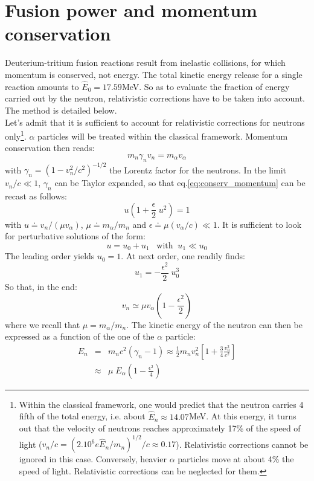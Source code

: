 \section{Fusion power and momentum conservation}
\label{appendix:fusion_power}

Deuterium-tritium fusion reactions result from inelastic collisions, for which momentum is conserved, not energy. The total kinetic energy release for a single reaction amounts to $\hat E_0 = 17.59$MeV. So as to evaluate the fraction of energy carried out by the neutron, relativistic corrections have to be taken into account. The method is detailed below. \\

Let's admit that it is sufficient to account for relativistic corrections for neutrons only\footnote{Within the classical framework, one would predict that the neutron carries 4 fifth of the total energy, i.e. about $\hat E_n \approx 14.07$MeV. At this energy, it turns out that the velocity of neutrons reaches approximately 17\% of the speed of light ($v_n/c = (2.10^6e\hat E_n/m_n)^{1/2}/c \approx 0.17$). Relativistic corrections cannot be ignored in this case. Conversely, heavier $\alpha$ particles move at about 4\% the speed of light. Relativistic corrections can be neglected for them.}. $\alpha$ particles will be treated within the classical framework.
Momentum conservation then reads:
\begin{equation}
    m_n \gamma_n v_n = m_\alpha v_\alpha
    \label{eq:conserv_momentum}
\end{equation}
with $\gamma_n = (1-v_n^2/c^2)^{-1/2}$ the Lorentz factor for the neutrons. In the limit $v_n/c \ll1$,  $\gamma_n$ can be Taylor expanded, so that eq.\ref{eq:conserv_momentum} can be recast as follows:
\begin{equation}
    u \left( 1+\frac{\epsilon}{2}\; u^2 \right) 
    = 1
    \label{eq:conserv_momentum2}
\end{equation}
with $u \doteq v_n/(\mu v_\alpha)$, $\mu \doteq m_\alpha/m_n$ and $\epsilon \doteq \mu (v_\alpha/c)\ll1$. It is sufficient to look for perturbative solutions of the form: 
$$ u = u_0 + u_1 \;\;\; \textrm{with} \;\; u_1\ll u_0 $$
The leading order yields $u_0=1$. At next order, one readily finds:
$$ u_1 = -\frac{\epsilon^2}{2} \; u_0^3 $$
So that, in the end:
\begin{equation*}
    v_n \simeq \mu v_\alpha \left( 1-\frac{\epsilon^2}{2}\right)
\end{equation*}
where we recall that $\mu=m_\alpha/m_n$.
The kinetic energy of the neutron can then be expressed as a function of the one of the $\alpha$ particle:
\begin{eqnarray*}
    E_n &=& m_nc^2(\gamma_n-1) \approx 
    \frac{1}{2} m_nv_n^2\left[ 1+ \frac{3}{4}\frac{v_n^2}{c^2}\right] \nonumber \\
    &\approx& \mu\; E_\alpha \left( 1-\frac{\epsilon^2}{4}\right)
\end{eqnarray*}

